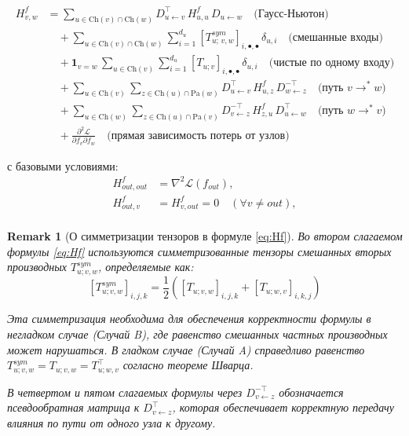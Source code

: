 \documentclass[11pt]{article}
\newtheorem{remark}{Remark}
\newcommand{\Pa}{\mathrm{Pa}} %
\newcommand{\Ch}{\mathrm{Ch}} %
\begin{document}
\begin{equation}\label{eq:Hf}
  \boxed{
    \begin{split}
      H^f_{v,w}
      &=
      \sum_{u\in\Ch(v)\cap\Ch(w)}
      D_{u\gets v}^\top\,H^f_{u,u}\,D_{u\gets w}
      \quad\text{(Гаусс-Ньютон)}\\
      &\quad+
      \sum_{u\in\Ch(v)\cap\Ch(w)}
      \sum_{i=1}^{d_u}
      [T_{u;\,v,w}^{sym}]_{i,\bullet,\bullet}\,\delta_{u,i}
      \quad\text{(смешанные входы)}\\
      &\quad+
      \mathbf{1}_{v=w}\,
      \sum_{u\in\Ch(v)}
      \sum_{i=1}^{d_u}
      [T_{u;v}]_{i,\bullet,\bullet}\,\delta_{u,i}
      \quad\text{(чистые по одному входу)}\\
      &\quad+
      \sum_{u\in\Ch(v)}\sum_{z\in\Ch(u)\cap\Pa(w)}
      D_{u\gets v}^\top\,H^f_{u,z}\,D_{w\gets z}^{-\top}
      \quad\text{(путь $v \rightarrow^* w$)}\\
      &\quad+
      \sum_{u\in\Ch(w)}\sum_{z\in\Ch(u)\cap\Pa(v)}
      D_{v\gets z}^{-\top}\,H^f_{z,u}\,D_{u\gets w}^\top
      \quad\text{(путь $w \rightarrow^* v$)}\\
      &\quad+
      \frac{\partial^2 \mathcal{L}}{\partial f_v \partial f_w}
      \quad\text{(прямая зависимость потерь от узлов)}
    \end{split}
  }
\end{equation}

с базовыми условиями:
\begin{align}
  H^f_{out,out} &= \nabla^2\mathcal L(f_{out}), \nonumber\\
  H^f_{out,v} &= H^f_{v,out} = 0\quad (\forall v\neq out), \nonumber\\
\end{align}

\begin{remark}[О симметризации тензоров в формуле \eqref{eq:Hf}]
  Во втором слагаемом формулы \eqref{eq:Hf} используются симметризованные тензоры смешанных вторых
  производных $T_{u;v,w}^{sym}$, определяемые как:
  \[
    [T_{u;v,w}^{sym}]_{i,j,k} = \frac{1}{2}([T_{u;v,w}]_{i,j,k} + [T_{u;w,v}]_{i,k,j})
  \]

  Эта симметризация необходима для обеспечения корректности формулы в негладком случае (Случай B),
  где равенство смешанных частных производных может нарушаться. В гладком случае (Случай A)
  справедливо равенство $T_{u;v,w}^{sym} = T_{u;v,w} = T_{u;w,v}^{\top}$ согласно теореме Шварца.

  В четвертом и пятом слагаемых формулы через $D_{v\gets z}^{-\top}$ обозначается
  псевдообратная матрица к $D_{v\gets z}^{\top}$, которая обеспечивает корректную
  передачу влияния по пути от одного узла к другому.
\end{remark}
\end{document}
